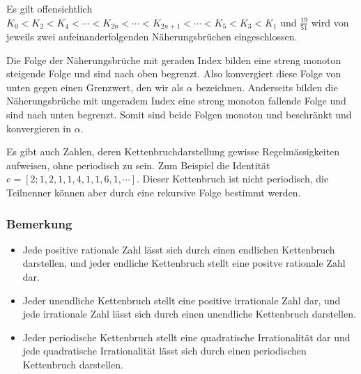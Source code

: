 Es gilt offensichtlich
$K_0 < K_2 < K_4 < \cdots < K_{2n} < \cdots < K_{2n+1} < \cdots < K_5
< K_3 < K_1$
und $\frac{19}{51}$ wird von jeweils zwei aufeinanderfolgenden
Näherungsbrüchen eingeschlossen.
 
Die Folge der Näherungsbrüche mit geraden Index bilden eine streng
monoton steigende Folge und sind nach oben begrenzt. Also konvergiert
diese Folge von unten gegen einen Grenzwert, den wir als $\alpha$
bezeichnen. Anderseits bilden die Näherungsbrüche mit ungeradem
Index eine streng monoton fallende Folge und sind nach unten begrenzt.
Somit sind beide Folgen monoton und beschränkt und konvergieren in
$\alpha$.

Es gibt auch Zahlen, deren Kettenbruchdarstellung gewisse
Regelmässigkeiten aufweisen, ohne periodisch zu sein. Zum Beispiel
die Identität $e = [2;1,2,1,1,4,1,1,6,1,\cdots]$. Dieser
Kettenbruch ist nicht periodisch, die Teilnenner können aber durch
eine rekursive Folge bestimmt werden.

\subsubsection{Bemerkung}
\begin{itemize}
\item
Jede positive rationale Zahl lässt sich durch einen endlichen
Kettenbruch darstellen, und jeder endliche Kettenbruch stellt eine
positve rationale Zahl dar.
\item
Jeder unendliche Kettenbruch stellt eine positive irrationale Zahl
dar, und jede irrationale Zahl lässt sich durch einen unendliche
Kettenbruch darstellen.
\item
Jeder periodische Kettenbruch stellt eine quadratische Irrationalität
dar und jede quadratische Irrationalität lässt sich durch einen
periodischen Kettenbruch darstellen.
\end{itemize}

